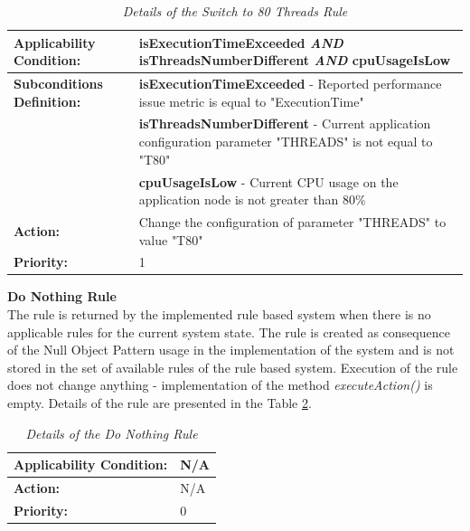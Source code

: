 \documentclass[10pt,a4paper]{article}
\begin{document}
\begin{table}[!htb]
\def\arraystretch{1.5}
\caption{\textit{Details of the Switch to 80 Threads Rule}} \label{rules80}
\begin{tabularx}{\textwidth}{p{2.1cm}|X}

\textbf{Applicability Condition:} & \textbf{isExecutionTimeExceeded} \textit{AND} \newline
\textbf{isThreadsNumberDifferent} \textit{AND} \newline
\textbf{cpuUsageIsLow} \\ \hline

\textbf{Subconditions Definition:} & \textbf{isExecutionTimeExceeded} -  Reported performance issue metric is equal to "ExecutionTime"  \\
& \textbf{isThreadsNumberDifferent} -  Current application configuration parameter "THREADS" is not equal to "T80" \\
& \textbf{cpuUsageIsLow} - Current CPU usage on the application node is not greater than 80\% \\ \hline

\textbf{Action:} & Change the configuration of parameter "THREADS" to value "T80" \\ \hline
\textbf{Priority:} & 1\\
\end{tabularx}
\end{table}

\vspace{10mm}
\noindent\textbf{Do Nothing Rule} \\
The rule is returned by the implemented rule based system when there is no applicable rules for the current system state.  The rule is created as consequence of the Null Object Pattern \cite{nop} usage in the implementation of the system and is not stored in the set of available rules of the rule based system. Execution of the rule does not change anything - implementation of the method \textit{executeAction()} is empty. Details of the rule are presented in the Table \ref{ruledonothing}.

\begin{table}[!htb]
\def\arraystretch{1.5}
\caption{\textit{Details of the Do Nothing Rule}} \label{ruledonothing}
\begin{tabularx}{\textwidth}{p{2.1cm}|X}

\textbf{Applicability Condition:} & N/A \\ \hline

\textbf{Action:} & N/A \\ \hline
\textbf{Priority:} & 0\\
\end{tabularx}
\end{table}
\end{document}
